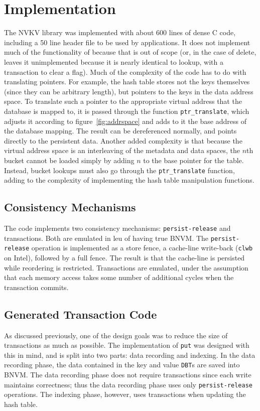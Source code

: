 \section{Implementation}

The NVKV library was implemented with about 600 lines of dense C code, including
a 50 line header file to be used by applications. It does not implement much of
the functionality of \bdb because that is out of scope (or, in the case of
delete, leaves it unimplemented because it is nearly identical to lookup, with a
transaction to clear a flag). Much of the complexity
of the code has to do with translating pointers. For example, the hash table
stores not the keys themselves (since they can be arbitrary length), but
pointers to the keys in the data address space. To translate such a pointer to
the appropriate virtual address that the database is mapped to, it is passed
through the function \texttt{ptr\_translate}, which adjusts it according to
figure~\ref{fig:addrspace} and adds to it the base address of the database
mapping. The result can be dereferenced normally, and points directly to the
persistent data. Another added complexity is that because the virtual address
space is an interleaving of the metadata and data spaces, the $n$th bucket
cannot be loaded simply by adding $n$ to the base pointer for the table.
Instead, bucket lookups must also go through the \texttt{ptr\_translate}
function, adding to the complexity of implementing the hash table manipulation
functions.

\subsection{Consistency Mechanisms}

The code implements two consistency mechanisms: \texttt{persist-release} and
transactions. Both are emulated in leu of having true BNVM. The
\texttt{persist-release} operation is implemented as a store fence, a cache-line
write-back (\texttt{clwb} on Intel), followed by a full fence. The result is
that the cache-line is persisted while reordering is restricted. Transactions
are emulated, under the assumption that each memory access takes some number of
additional cycles when the transaction commits.


\subsection{Generated Transaction Code}

As discussed previously, one of the design goals was to reduce the size of
transactions as much as possible. The implementation of \texttt{put} was
designed with this in mind, and is split into two parts: data recording and
indexing. In the data recording phase, the data contained in the key and value
\texttt{DBT}s are saved into BNVM.
The data recording
phase does not require transactions since each write maintains correctness; thus
the data recording phase uses only \texttt{persist-release} operations. The
indexing phase, however, uses transactions when updating the hash table.

